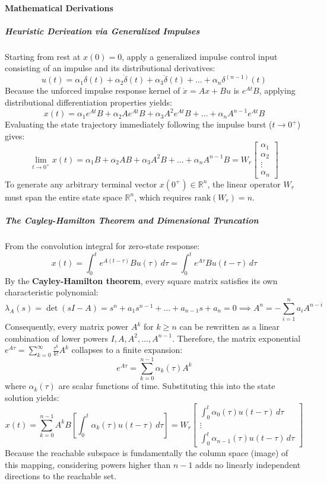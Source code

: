 \documentclass[12pt,onecolumn,twoside ]{article}
\begin{document}
	\paragraph{Mathematical Derivations}
	\subparagraph{Heuristic Derivation via Generalized Impulses}
	Starting from rest at $x(0) = 0$, apply a generalized impulse control input consisting of an impulse and its distributional derivatives: \[
	u(t) = \alpha_1 \delta(t) + \alpha_2 \dot{\delta}(t) + \alpha_3 \ddot{\delta}(t) + \dots + \alpha_n \delta^{(n-1)}(t)
	\] Because the unforced impulse response kernel of $\dot{x} = Ax + Bu$ is $e^{At}B$, applying distributional differentiation properties yields: \[
	x(t) = \alpha_1 e^{At}B + \alpha_2 A e^{At}B + \alpha_3 A^2 e^{At}B + \dots + \alpha_n A^{n-1} e^{At}B
	\] Evaluating the state trajectory immediately following the impulse burst ($t \to 0^+$) gives: \[
	\lim_{t \to 0^+} x(t) = \alpha_1 B + \alpha_2 AB + \alpha_3 A^2 B + \dots + \alpha_n A^{n-1} B = W_r \begin{bmatrix} \alpha_1 \\ \alpha_2 \\ \vdots \\ \alpha_n \end{bmatrix}
	\] To generate any arbitrary terminal vector $x(0^+) \in \mathbb{R}^n$, the linear operator $W_r$ must span the entire state space $\mathbb{R}^n$, which requires $\text{rank}(W_r) = n$.
	\subparagraph{The Cayley-Hamilton Theorem and Dimensional Truncation}
	From the convolution integral for zero-state response: \[
	x(t) = \int_{0}^t e^{A(t - \tau)} B u(\tau)\, d\tau = \int_{0}^t e^{A\tau} B u(t - \tau)\, d\tau
	\] By the \textbf{Cayley-Hamilton theorem}, every square matrix satisfies its own characteristic polynomial: \[
	\lambda_A(s) = \det(sI - A) = s^n + a_1 s^{n-1} + \dots + a_{n-1} s + a_n = 0 \implies A^n = -\sum_{i=1}^n a_i A^{n-i}
	\] Consequently, every matrix power $A^k$ for $k \ge n$ can be rewritten as a linear combination of lower powers ${I, A, A^2, \dots, A^{n-1}}$. Therefore, the matrix exponential $e^{A\tau} = \sum_{k=0}^\infty \frac{\tau^k}{k!} A^k$ collapses to a finite expansion: \[
	e^{A\tau} = \sum_{k=0}^{n-1} \alpha_k(\tau) A^k
	\] where $\alpha_k(\tau)$ are scalar functions of time. Substituting this into the state solution yields: \[
	x(t) = \sum_{k=0}^{n-1} A^k B \left[ \int_{0}^t \alpha_k(\tau) u(t - \tau)\, d\tau \right] = W_r \begin{bmatrix} \int_{0}^t \alpha_0(\tau) u(t - \tau)\, d\tau \\ \vdots \\ \int_{0}^t \alpha_{n-1}(\tau) u(t - \tau)\, d\tau \end{bmatrix}
	\] Because the reachable subspace is fundamentally the column space (image) of this mapping, considering powers higher than $n-1$ adds no linearly independent directions to the reachable set.
	
\end{document}
